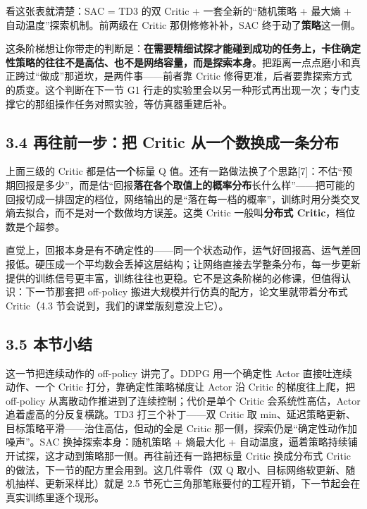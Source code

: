 \documentclass[
  chinese,
]{ctexart}
\begin{document}
看这张表就清楚：SAC = TD3 的双 Critic + 一套全新的``随机策略 + 最大熵 +
自动温度''探索机制。前两级在 Critic 那侧修修补补，SAC
终于动了\textbf{策略}这一侧。

这条阶梯想让你带走的判断是：\textbf{在需要精细试探才能碰到成功的任务上，卡住确定性策略的往往不是高估、也不是网络容量，而是探索本身}。把距离一点点磨小和真正跨过``做成''那道坎，是两件事------前者靠
Critic 修得更准，后者要靠探索方式的质变。这个判断在下一节 G1
行走的实验里会以另一种形式再出现一次；专门支撑它的那组操作任务对照实验，等仿真器重建后补。

\subsection{3.4 再往前一步：把 Critic
从一个数换成一条分布}\label{ux518dux5f80ux524dux4e00ux6b65ux628a-critic-ux4eceux4e00ux4e2aux6570ux6362ux6210ux4e00ux6761ux5206ux5e03}

上面三级的 Critic 都是估\textbf{一个}标量 Q
值。还有一路做法换了个思路{[}7{]}：不估``预期回报是多少''，而是估``回报\textbf{落在各个取值上的概率分布}长什么样''------把可能的回报切成一排固定的档位，网络输出的是``落在每一档的概率''，训练时用分类交叉熵去拟合，而不是对一个数做均方误差。这类
Critic 一般叫\textbf{分布式 Critic}，档位数是个超参。

直觉上，回报本身是有不确定性的------同一个状态动作，运气好回报高、运气差回报低。硬压成一个平均数会丢掉这层结构；让网络直接去学整条分布，每一步更新提供的训练信号更丰富，训练往往也更稳。它不是这条阶梯的必修课，但值得认识：下一节那套把
off-policy 搬进大规模并行仿真的配方，论文里就带着分布式 Critic（4.3
节会说到，我们的课堂版刻意没上它）。

\subsection{3.5 本节小结}\label{ux672cux8282ux5c0fux7ed3-2}

这一节把连续动作的 off-policy 讲完了。DDPG 用一个确定性 Actor
直接吐连续动作、一个 Critic 打分，靠确定性策略梯度让 Actor 沿 Critic
的梯度往上爬，把 off-policy 从离散动作推进到了连续控制；代价是单个
Critic 会系统性高估，Actor 追着虚高的分反复横跳。TD3 打三个补丁------双
Critic 取 min、延迟策略更新、目标策略平滑------治住高估，但动的全是
Critic 那一侧，探索仍是``确定性动作加噪声''。SAC 换掉探索本身：随机策略
+ 熵最大化 +
自动温度，逼着策略持续铺开试探，这才动到策略那一侧。再往前还有一路把标量
Critic 换成分布式 Critic 的做法，下一节的配方里会用到。这几件零件（双 Q
取小、目标网络软更新、随机抽样、更新采样比）就是 2.5
节死亡三角那笔账要付的工程开销，下一节起会在真实训练里逐个现形。
\end{document}
